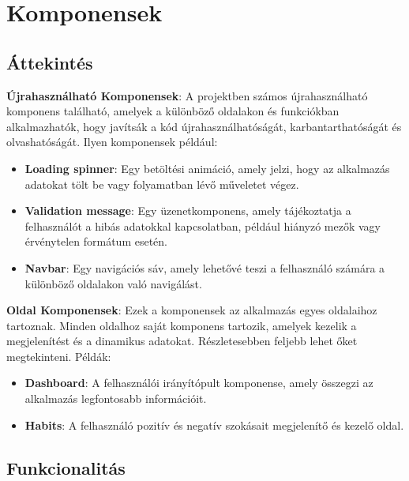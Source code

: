 \documentclass[12pt]{report}
\begin{document}
\section{Komponensek}

\subsection{Áttekintés}

\textbf{Újrahasználható Komponensek}: A projektben számos újrahasználható komponens található, amelyek a különböző oldalakon és funkciókban alkalmazhatók, hogy javítsák a kód újrahasználhatóságát, karbantarthatóságát és olvashatóságát. Ilyen komponensek például:

\begin{itemize}
  \item \textbf{Loading spinner}: Egy betöltési animáció, amely jelzi, hogy az alkalmazás adatokat tölt be vagy folyamatban lévő műveletet végez.
  \item \textbf{Validation message}: Egy üzenetkomponens, amely tájékoztatja a felhasználót a hibás adatokkal kapcsolatban, például hiányzó mezők vagy érvénytelen formátum esetén.
  \item \textbf{Navbar}: Egy navigációs sáv, amely lehetővé teszi a felhasználó számára a különböző oldalakon való navigálást.
\end{itemize}

\textbf{Oldal Komponensek}: Ezek a komponensek az alkalmazás egyes oldalaihoz tartoznak. Minden oldalhoz saját komponens tartozik, amelyek kezelik a megjelenítést és a dinamikus adatokat. Részletesebben feljebb lehet őket megtekinteni. Példák:

\begin{itemize}
  \item \textbf{Dashboard}: A felhasználói irányítópult komponense, amely összegzi az alkalmazás legfontosabb információit.
  \item \textbf{Habits}: A felhasználó pozitív és negatív szokásait megjelenítő és kezelő oldal.
\end{itemize}

\subsection{Funkcionalitás}
\end{document}
